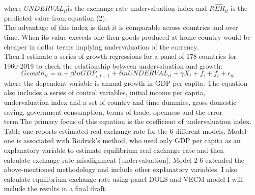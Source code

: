 \documentclass{article}
\begin{document}
where $UNDERVAL_{it} $is the exchange rate undervaluation index and $\hat{RER_{it}}$ is the predicted value from equation (2).\\
The advantage of this index is that it is comparable across countries and over time. When its value exceeds one then goods produced at home country would be cheaper in dollar terms implying undervaluation of the currency.\\
Then I estimate a series of growth regressions for a panel of 178 countries for 1960-2019 to check the relationship between undervaluation and growth:\\
\begin{equation}
Geowth_{it}=\alpha+\beta lnGDP_{i,t-1}+\delta ln UNDERVAL_{it}+\gamma X_t+f_i+ f_t+\epsilon_{it}
\end{equation}
where the dependent variable is annual growth in GDP per capita. The equation also includes a series of control variables, initial income per capita, undervaluation index and a set of country and time dummies, gross domestic saving, government consumption, terms of trade, openness and the error term.The primary focus of this equation is the coefficient of undervaluation index. \\
Table one reports estimated real exchange rate for the 6 different models. Model one is associated with Rodrick's method, who used only GDP per capita as an explanatory variable to estimate equilibrium real exchange rate and then calculate exchange rate misalignment (undervaluation), Model 2-6 extended the above-mentioned methodology and include other explanatory variables. I also calculate equilibrium exchange rate using panel DOLS and VECM model I will include the results in a final draft.
\end{document}
